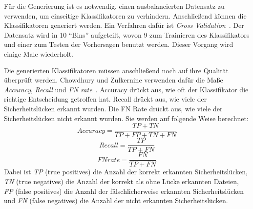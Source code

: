 Für die Generierung ist es notwendig, einen ausbalancierten Datensatz zu verwenden, um einseitige Klassifikatoren zu verhindern.
Anschließend können die Klassifikatoren generiert werden.
Ein Verfahren dafür ist \emph{Cross Validation}~\cite{chowdhury_zulkernine_2009}.
Der Datensatz wird in 10 "`Bins"' aufgeteilt, wovon 9 zum Trainieren des Klassifikators und einer zum Testen der Vorhersagen benutzt werden.
Dieser Vorgang wird einige Male wiederholt.

Die generierten Klassifikatoren müssen anschließend noch auf ihre Qualität überprüft werden.
Chowdhury und Zulkernine verwenden dafür die Maße \emph{Accuracy}, \emph{Recall} und \emph{FN rate}~\cite{chowdhury_zulkernine_2009}.
Accuracy drückt aus, wie oft der Klassifikator die richtige Entscheidung getroffen hat.
Recall drückt aus, wie viele der Sicherheitslücken erkannt wurden.
Die FN Rate drückt aus, wie viele der Sicherheitslücken nicht erkannt wurden.
Sie werden auf folgende Weise berechnet:
\begin{equation}
	Accuracy = \frac{TP+TN}{TP+FP+TN+FN}
\end{equation}
\begin{equation}
	Recall = \frac{TP}{TP+FN}
\end{equation}
\begin{equation}
	FN rate = \frac{FN}{TP+FN}
\end{equation}
Dabei ist \emph{TP} (true positives) die Anzahl der korrekt erkannten Sicherheitslücken,
\emph{TN} (true negatives) die Anzahl der korrekt als ohne Lücke erkannten Dateien,
\emph{FP} (false positives) die Anzahl der fälschlicherweise erkannten Sicherheitslücken und
\emph{FN} (false negatives) die Anzahl der nicht erkannten Sicherheitslücken.
